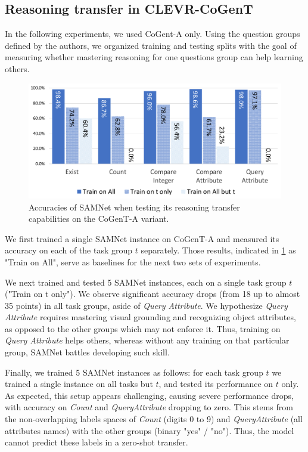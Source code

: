 \subsection{Reasoning transfer in CLEVR-CoGenT}
\label{sec:reasoning-transfer-clevr}
In the following experiments, we used CoGent-A only.
Using the question groups defined by the authors, we organized training and testing splits with the goal of measuring whether mastering reasoning for one questions group can help learning others.

\begin{figure}[htbp]
	\centering
	\includegraphics[width=\textwidth]{../img/plots/cogent_reasoning_transfer.pdf}
	\caption{Accuracies of SAMNet when testing its reasoning transfer capabilities on the CoGenT-A variant.}
	\label{fig:cogent_reasoning_transfer}
\end{figure}

We first trained a single SAMNet instance on CoGenT-A and measured its accuracy on each of the task group $t$ separately.
Those results, indicated in \cref{fig:cogent_reasoning_transfer} as "Train on All", serve as baselines for the next two sets of experiments.

We next trained and tested 5 SAMNet instances, each on a single task group $t$ ("Train on t only").
We observe significant accuracy drops (from 18 up to almost 35 points) in all task groups, aside of \textit{Query Attribute}.
We hypothesize \textit{Query Attribute} requires mastering visual grounding and recognizing object attributes, as opposed to the other groups which may not enforce it.
Thus, training on \textit{Query Attribute} helps others, whereas without any training on that particular group, SAMNet battles developing such skill.

Finally, we trained 5 SAMNet instances as follows: for each task group $t$ we trained a single instance on all tasks but $t$, and tested its performance on $t$ only.
As expected, this setup appears challenging, causing severe performance drops, with accuracy on \textit{Count} and \textit{QueryAttribute} dropping to zero.
This stems from the non-overlapping labels spaces of \textit{Count} (digits 0 to 9) and \textit{QueryAttribute} (all attributes names) with the other groups (binary "yes" / "no"). Thus, the model cannot predict these labels in a zero-shot transfer.

